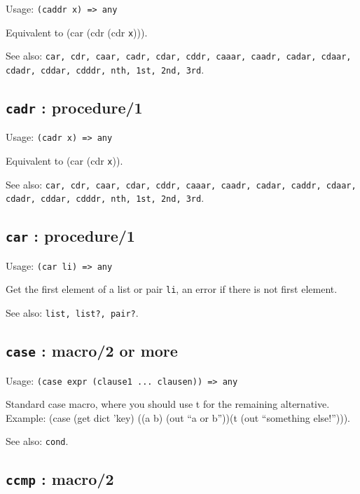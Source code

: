 \documentclass[
]{article}
\newcommand{\passthrough}[1]{#1}
\begin{document}
Usage: \passthrough{\lstinline!(caddr x) => any!}

Equivalent to (car (cdr (cdr \passthrough{\lstinline!x!}))).

See also:
\passthrough{\lstinline!car, cdr, caar, cadr, cdar, cddr, caaar, caadr, cadar, cdaar, cdadr, cddar, cdddr, nth, 1st, 2nd, 3rd!}.

\hypertarget{cadr-procedure1-1}{%
\subsection{\texorpdfstring{\texttt{cadr} :
procedure/1}{cadr : procedure/1}}\label{cadr-procedure1-1}}

Usage: \passthrough{\lstinline!(cadr x) => any!}

Equivalent to (car (cdr \passthrough{\lstinline!x!})).

See also:
\passthrough{\lstinline!car, cdr, caar, cdar, cddr, caaar, caadr, cadar, caddr, cdaar, cdadr, cddar, cdddr, nth, 1st, 2nd, 3rd!}.

\hypertarget{car-procedure1-1}{%
\subsection{\texorpdfstring{\texttt{car} :
procedure/1}{car : procedure/1}}\label{car-procedure1-1}}

Usage: \passthrough{\lstinline!(car li) => any!}

Get the first element of a list or pair \passthrough{\lstinline!li!}, an
error if there is not first element.

See also: \passthrough{\lstinline!list, list?, pair?!}.

\hypertarget{case-macro2-or-more-1}{%
\subsection{\texorpdfstring{\texttt{case} : macro/2 or
more}{case : macro/2 or more}}\label{case-macro2-or-more-1}}

Usage:
\passthrough{\lstinline!(case expr (clause1 ... clausen)) => any!}

Standard case macro, where you should use t for the remaining
alternative. Example: (case (get dict 'key) ((a b) (out ``a or b''))(t
(out ``something else!''))).

See also: \passthrough{\lstinline!cond!}.

\hypertarget{ccmp-macro2-1}{%
\subsection{\texorpdfstring{\texttt{ccmp} :
macro/2}{ccmp : macro/2}}\label{ccmp-macro2-1}}
\end{document}
